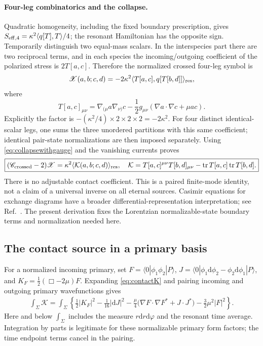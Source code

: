 \documentclass[11pt,a4paper]{article}
\numberwithin{equation}{section}
\theoremstyle{remark}\newtheorem{remark}[theorem]{Remark}
\newcommand{\dd}{\mathrm d}
\newcommand{\tr}{\operatorname{tr}}
\newcommand{\kap}{\kappa}
\newcommand{\calC}{\mathscr C}
\newcommand{\ket}[1]{|#1\rangle}
\newcommand{\bra}[1]{\langle#1|}
\begin{document}
\paragraph{Four-leg combinatorics and the collapse.}
Quadratic homogeneity, including the fixed boundary prescription, gives
$S_{\rm eff,4}=\kap^2\langle q[T],T\rangle/4$; the resonant Hamiltonian has the opposite sign. Temporarily distinguish two equal-mass scalars. In the interspecies part there are two reciprocal terms, and in each species the incoming/outgoing coefficient of the polarized stress is $2T[a,c]$. Therefore the normalized crossed four-leg symbol is
\begin{equation}
 \mathscr X(a,b;c,d)=-2\kap^2
 \langle T[a,c],q[T[b,d]]\rangle_{\rm res},
 \label{eq:crossnormalization}
\end{equation}
where
\begin{equation}
 T[a,c]_{\mu\nu}=\nabla_{(\mu}a\nabla_{\nu)}c
 -\frac12g_{\mu\nu}(\nabla a\cdot\nabla c+\mu ac).
\end{equation}
Explicitly the factor is $-(\kap^2/4)\times2\times2\times2=-2\kap^2$.
For four distinct identical-scalar legs, one sums the three unordered partitions with this same coefficient; identical pair-state normalizations are then imposed separately.
Using \eqref{eq:collapsewithgauge} and the vanishing currents proves
\begin{equation}
 \boxed{(\calC_{\rm crossed}-2)\mathscr X
 =\kap^2\langle\mathcal K(a,b;c,d)\rangle_{\rm res},\quad
 \mathcal K=T[a,c]^{\mu\nu}T[b,d]_{\mu\nu}
 -\tr T[a,c]\tr T[b,d].}
 \label{eq:contactK}
\end{equation}
There is no adjustable contact coefficient. This is a paired finite-mode identity, not a claim of a universal inverse on all eternal sources. Casimir equations for exchange diagrams have a broader differential-representation interpretation; see Ref.~\cite{LM}. The present derivation fixes the Lorentzian normalizable-state boundary terms and normalization needed here.

\subsection{The contact source in a primary basis}

For a normalized incoming primary, set $F=\bra0\phi_1\phi_2\ket P$,
$J=\bra0\phi_1\dd\phi_2-\phi_2\dd\phi_1\ket P$, and
$K_F=\frac12(\Box-2\mu)F$. Expanding \eqref{eq:contactK} and pairing incoming and outgoing primary wavefunctions gives
\begin{align}
 \int_\Sigma\mathcal K
 =\int_\Sigma\left\{
 \frac12|K_F|^2-\frac1{16}|\dd J|^2
 -\frac\mu4\bigl(\nabla F\cdot\nabla F^*+J\cdot J^*\bigr)
 -\frac32\mu^2|F|^2\right\}.
 \label{eq:Kdecomp}
\end{align}
Here and below $\int_\Sigma$ includes the measure $r\dd r\dd\varphi$ and the resonant time average. Integration by parts is legitimate for these normalizable primary form factors; the time endpoint terms cancel in the pairing.
\end{document}
